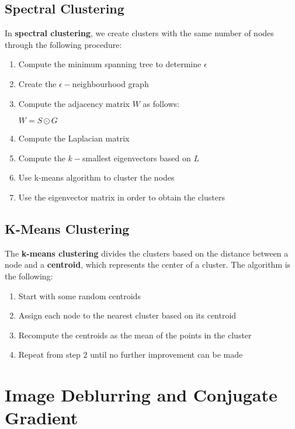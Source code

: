 \documentclass{article}
\begin{document}
\subsection{Spectral Clustering}
In \textbf{spectral clustering}, we create clusters with the same number of nodes through the following procedure:
\begin{enumerate}
    \item Compute the minimum spanning tree to determine $\epsilon$
    \item Create the $\epsilon-$neighbourhood graph
    \item Compute the adjacency matrix $W$ as follows:
    \begin{center}
        $W = S \odot G$
    \end{center}
    \item Compute the Laplacian matrix
    \item Compute the $k-$smallest eigenvectors based on $L$
    \item Use k-means algorithm to cluster the nodes
    \item Use the eigenvector matrix in order to obtain the clusters
\end{enumerate}
\subsection{K-Means Clustering}
The \textbf{k-means clustering} divides the clusters based on the distance between a node and a \textbf{centroid}, which represents the center of a cluster. The algorithm is the following:
\begin{enumerate}
    \item Start with some random centroids
    \item Assign each node to the nearest cluster based on its centroid
    \item Recompute the centroids as the mean of the points in the cluster
    \item Repeat from step $2$ until no further improvement can be made
\end{enumerate}

\newpage

\section{Image Deblurring and Conjugate Gradient}
\end{document}
